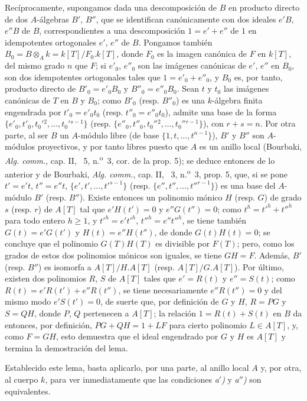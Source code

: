 Recíprocamente, supongamos dada una descomposición de $B$ en producto directo de dos $A$-álgebras $B'$, $B''$, que se identifican canónicamente con dos ideales $e'B$, $e''B$ de $B$, correspondientes a una descomposición $1=e'+e''$ de $1$ en idempotentes ortogonales $e'$, $e''$ de $B$. Pongamos también $B_0=B\otimes_A k=k[T]/F_0.k[T]$, donde $F_0$ es la imagen canónica de $F$ en $k[T]$, del mismo grado $n$ que $F$; si $e'_0$, $e''_0$ son las imágenes canónicas de $e'$, $e''$ en $B_0$, son dos idempotentes ortogonales tales que $1=e'_0+e''_0$, y $B_0$ es, por tanto, producto directo de $B'_0=e'_0B_0$ y $B''_0=e''_0B_0$. Sean $t$ y $t_0$ las imágenes canónicas de $T$ en $B$ y $B_0$; como $B'_0$ (resp. $B''_0$) es una $k$-álgebra finita engendrada por $t'_0=e'_0t_0$ (resp. $t''_0=e''_0t_0$), admite una base de la forma $\{e'_0,t'_0,t_0'{}^2,\ldots,t_0'{}^{s-1}\}$ (resp. $\{e''_0,t''_0,t_0''{}^2,\ldots,t_0''{}^{r-1}\}$), con $r+s=n$. Por otra parte, al ser $B$ un $A$-módulo libre (de base $\{1,t,\ldots,t^{n-1}\}$), $B'$ y $B''$ son $A$-módulos proyectivos, y por tanto libres puesto que $A$ es un anillo local (Bourbaki, \emph{Alg. comm.}, cap. II, \textsection~5, n.\textsuperscript{o}~3, cor. de la prop. 5); se deduce entonces de lo anterior y de Bourbaki, \emph{Alg. comm.}, cap. II, \textsection~3, n.\textsuperscript{o}~3, prop. 5, que, si se pone $t'=e't$, $t''=e''t$, $\{e',t',\ldots,t'^{s-1}\}$ (resp. $\{e'',t'',\ldots,t''^{r-1}\}$) es una base del $A$-módulo $B'$ (resp. $B''$). Existe entonces un polinomio mónico $H$ (resp. $G$) de grado $s$ (resp. $r$) de $A[T]$ tal que $e'H(t')=0$ y $e''G(t'')=0$; como $t^h=t'^h+t''^h$ para todo entero $h\geq1$, y $t'^h=e't'^h$, $t''^h=e''t''^h$, se tiene también $G(t)=e'G(t')$ y $H(t)=e''H(t'')$, de donde $G(t)H(t)=0$; se concluye que el polinomio $G(T)H(T)$ es divisible por $F(T)$; pero, como los grados de estos dos polinomios mónicos son iguales, se tiene $GH=F$. Además, $B'$ (resp. $B''$) es isomorfa a $A[T]/H.A[T]$ (resp. $A[T]/G.A[T]$). Por último, existen dos polinomios $R$, $S$ de $A[T]$ tales que $e'=R(t)$ y $e''=S(t)$; como $R(t)=e'R(t')+e''R(t'')$, se tiene necesariamente $e''R(t'')=0$ y del mismo modo $e'S(t')=0$, de suerte que, por definición de $G$ y $H$, $R=PG$ y $S=QH$, donde $P$, $Q$ pertenecen a $A[T]$; la relación $1=R(t)+S(t)$ en $B$ da entonces, por definición, $PG+QH=1+LF$ para cierto polinomio $L\in A[T]$, y, como $F=GH$, esto demuestra que el ideal engendrado por $G$ y $H$ es $A[T]$ y termina la demostración del lema.

Establecido este lema, basta aplicarlo, por una parte, al anillo local $A$ y, por otra, al cuerpo $k$, para ver inmediatamente que las condiciones \emph{a$'$)} y \emph{a$''$)} son equivalentes.

